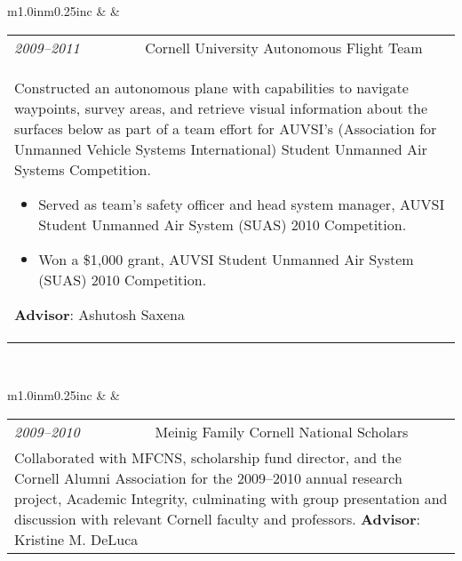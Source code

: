 \documentclass[11pt]{article}
\begin{document}
\begin{center}
\begin{tabular}{m{1.0in}m{0.25in}c}
 & & 
\begin{tabular}{m{0.85in}m{0.15in}m{3.75in}}
\textit{\small{2009--2011}} & & Cornell University Autonomous Flight Team \\ \multicolumn{3}{p{4.75in}}{\footnotesize{Constructed an autonomous plane with capabilities to navigate waypoints, survey areas, and retrieve visual information about the surfaces below as part of a team effort for AUVSI's (Association for Unmanned Vehicle Systems International) Student Unmanned Air Systems Competition. \noindent\begin{itemize}[leftmargin=*] \item Served as \textcolor{NavyBlue}{team's safety officer} and \textcolor{NavyBlue}{head system manager}, AUVSI Student Unmanned Air System (SUAS) 2010 Competition. \item \textcolor{NavyBlue}{Won a \$1,000 grant}, AUVSI Student Unmanned Air System (SUAS) 2010 Competition. \end{itemize} \textbf{Advisor}: Ashutosh Saxena}} 
\end{tabular} \\ 
\end{tabular}
\end{center}

\begin{center}
\begin{tabular}{m{1.0in}m{0.25in}c}
 & & 
\begin{tabular}{m{0.85in}m{0.15in}m{3.75in}}
\textit{\small{2009--2010}} & & Meinig Family Cornell National Scholars \\ \multicolumn{3}{p{4.75in}}{\footnotesize{Collaborated with MFCNS, scholarship fund director, and the Cornell Alumni Association for the 2009--2010 annual research project, Academic Integrity, culminating with group presentation and discussion with relevant Cornell faculty and professors. \newline \textbf{Advisor}: Kristine M. DeLuca}} 
\end{tabular} \\ 
\end{tabular}
\end{center}

\noindent\hspace{0cm}\textcolor{black}{\textsc{}}
\end{document}
